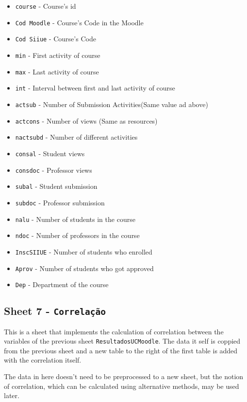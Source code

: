 \begin{itemize}
    \item \texttt{course} - Course's id
    \item \texttt{Cod Moodle} - Course's Code in the Moodle
    \item \texttt{Cod Siiue} - Course's Code
    \item \texttt{min} - First activity of course
    \item \texttt{max} - Last activity of course
    \item \texttt{int} - Interval between first and last activity of course
    \item \texttt{actsub} - Number of Submission Activities(Same value ad above)
    \item \texttt{actcons} - Number of views (Same as resources)
    \item \texttt{nactsubd} - Number of different activities
    \item \texttt{consal} - Student views
    \item \texttt{consdoc} - Professor views
    \item \texttt{subal} - Student submission
    \item \texttt{subdoc} - Professor submission
    \item \texttt{nalu} - Number of students in the course
    \item \texttt{ndoc} - Number of professors in the course
    \item \texttt{InscSIIUE} - Number of students who enrolled
    \item \texttt{Aprov} - Number of students who got approved
    \item \texttt{Dep} - Department of the course
\end{itemize}

\subsection{Sheet 7 - \texttt{Correlação}}

This is a sheet that implements the calculation of correlation between the
variables of the previous sheet \texttt{ResultadosUCMoodle}. The data it self
is coppied from the previous sheet and a new table to the right of the first
table is added with the correlation itself.

The data in here doesn't need to be preprocessed to a new sheet, but the notion
of correlation, which can be calculated using alternative methods, may be used
later.

